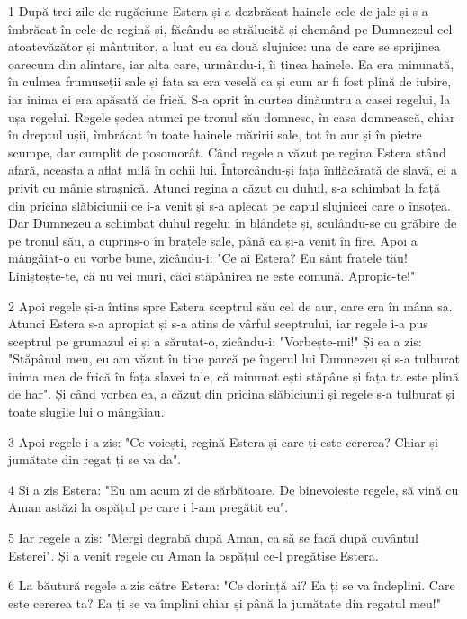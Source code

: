 \par 1 După trei zile de rugăciune Estera și-a dezbrăcat hainele cele de jale și s-a îmbrăcat în cele de regină și, făcându-se strălucită și chemând pe Dumnezeul cel atoatevăzător și mântuitor, a luat cu ea două slujnice: una de care se sprijinea oarecum din alintare, iar alta care, urmându-i, îi ținea hainele. Ea era minunată, în culmea frumuseții sale și fața sa era veselă ca și cum ar fi fost plină de iubire, iar inima ei era apăsată de frică. S-a oprit în curtea dinăuntru a casei regelui, la ușa regelui. Regele ședea atunci pe tronul său domnesc, în casa domnească, chiar în dreptul ușii, îmbrăcat în toate hainele măririi sale, tot în aur și în pietre scumpe, dar cumplit de posomorât. Când regele a văzut pe regina Estera stând afară, aceasta a aflat milă în ochii lui. Întorcându-și fața înflăcărată de slavă, el a privit cu mânie strașnică. Atunci regina a căzut cu duhul, s-a schimbat la față din pricina slăbiciunii ce i-a venit și s-a aplecat pe capul slujnicei care o însoțea. Dar Dumnezeu a schimbat duhul regelui în blândețe și, sculându-se cu grăbire de pe tronul său, a cuprins-o în brațele sale, până ea și-a venit în fire. Apoi a mângâiat-o cu vorbe bune, zicându-i: "Ce ai Estera? Eu sânt fratele tău! Liniștește-te, că nu vei muri, căci stăpânirea ne este comună. Apropie-te!"
\par 2 Apoi regele și-a întins spre Estera sceptrul său cel de aur, care era în mâna sa. Atunci Estera s-a apropiat și s-a atins de vârful sceptrului, iar regele i-a pus sceptrul pe grumazul ei și a sărutat-o, zicându-i: "Vorbește-mi!" Și ea a zis: "Stăpânul meu, eu am văzut în tine parcă pe îngerul lui Dumnezeu și s-a tulburat inima mea de frică în fața slavei tale, că minunat ești stăpâne și fața ta este plină de har". Și când vorbea ea, a căzut din pricina slăbiciunii și regele s-a tulburat și toate slugile lui o mângâiau.
\par 3 Apoi regele i-a zis: "Ce voiești, regină Estera și care-ți este cererea? Chiar și jumătate din regat ți se va da".
\par 4 Și a zis Estera: "Eu am acum zi de sărbătoare. De binevoiește regele, să vină cu Aman astăzi la ospățul pe care i l-am pregătit eu".
\par 5 Iar regele a zis: "Mergi degrabă după Aman, ca să se facă după cuvântul Esterei". Și a venit regele cu Aman la ospățul ce-l pregătise Estera.
\par 6 La băutură regele a zis către Estera: "Ce dorință ai? Ea ți se va îndeplini. Care este cererea ta? Ea ți se va împlini chiar și până la jumătate din regatul meu!"
